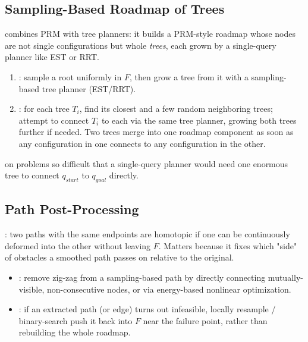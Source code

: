\subsection{Sampling-Based Roadmap of Trees}
 combines PRM with tree planners: it builds a PRM-style roadmap whose nodes are not single configurations but whole \emph{trees}, each grown by a single-query planner like EST or RRT.
\begin{enumerate}
\item {}: sample a root uniformly in $F$, then grow a tree from it with a sampling-based tree planner (EST/RRT).
\item {}: for each tree $T_i$, find its closest and a few random neighboring trees; attempt to connect $T_i$ to each via the same tree planner, growing both trees further if needed. Two trees merge into one roadmap component as soon as any configuration in one connects to any configuration in the other.
\end{enumerate}
 on problems so difficult that a single-query planner would need one enormous tree to connect $q_{start}$ to $q_{goal}$ directly.


\subsection{Path Post-Processing}
: two paths with the same endpoints are homotopic if one can be continuously deformed into the other without leaving $F$. Matters because it fixes which "side" of obstacles a smoothed path passes on relative to the original.
\begin{itemize}
\item {}: remove zig-zag from a sampling-based path by directly connecting mutually-visible, non-consecutive nodes, or via energy-based nonlinear optimization.
\item {}: if an extracted path (or edge) turns out infeasible, locally resample / binary-search push it back into $F$ near the failure point, rather than rebuilding the whole roadmap.
\end{itemize}


